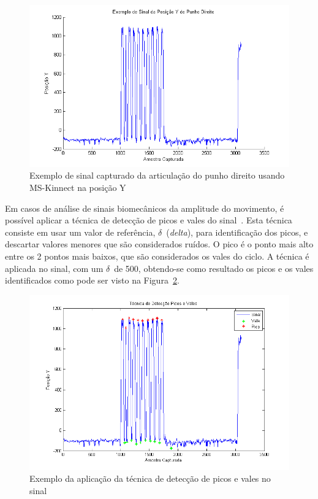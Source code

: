 \begin{figure}[!htb]
     \centering
     \includegraphics[width=1\textwidth]{./img/exsinalposicaoypunhodireito.png}
     \caption{Exemplo de sinal capturado da articulação do punho direito usando MS-Kinnect na posição Y}
     \label{img:exsinalposicaopunho}
\end{figure}


Em casos de análise de sinais biomecânicos da amplitude do movimento, é possível aplicar a técnica de detecção de picos e vales do sinal~\cite{peakdetect}. Esta técnica consiste em usar um valor de referência, $\delta$\ (\textit{delta}), para identificação dos picos, e descartar valores menores que são considerados ruídos. O pico é o ponto mais alto entre os 2 pontos mais baixos, que são considerados os vales do ciclo. A técnica é aplicada no sinal, com um $\delta$\ de 500, obtendo-se como resultado os picos e os vales identificados como pode ser visto na Figura~\ref{img:expicosvales}.

\begin{figure}[!htb]
     \centering
     \includegraphics[width=1\textwidth]{./img/deteccaopicosvales.png}
     \caption{Exemplo da aplicação da técnica de detecção de picos e vales no sinal}
     \label{img:expicosvales}
\end{figure}


